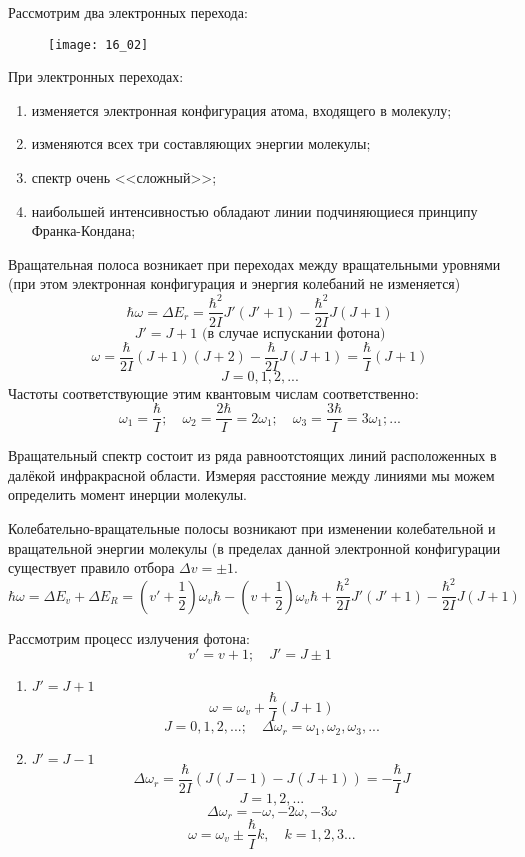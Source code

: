 Рассмотрим два электронных перехода: 
\begin{figure}[h!]
    \center
    \texttt{[image: 16\_02]}
\end{figure}

При электронных переходах:
\begin{enumerate}
    \item изменяется электронная конфигурация атома, 
    входящего в молекулу; 
    \item изменяются всех три составляющих энергии молекулы; 
    \item спектр очень <<сложный>>;
    \item наибольшей интенсивностью обладают линии подчиняющиеся принципу 
    Франка-Кондана;
\end{enumerate}

Вращательная полоса возникает при переходах между вращательными уровнями 
(при этом электронная конфигурация и энергия колебаний не изменяется)
\[ 
    \hbar\omega = \Delta E_r = \frac{\hbar^2}{2I} J'(J'+1) - 
    \frac{\hbar^2}{2I} J(J+1)
\]
\[ J' = J + 1 \text{ (в случае испускании фотона)} \]
\[ 
    \omega = \frac{\hbar}{2I}(J+1)(J+2) - \frac{\hbar}{2I}J(J+1) = 
    \frac{\hbar}{I}(J+1)
\]
\[ 
    J = 0, 1, 2, ...
\]
Частоты соответствующие этим квантовым числам соответственно:
\[ 
    \omega_1 = \frac{\hbar}{I}; \quad
    \omega_2 = \frac{2\hbar}{I} = 2\omega_1; \quad
    \omega_3 = \frac{3\hbar}{I} = 3\omega_1; ...
\]

Вращательный спектр состоит из ряда равноотстоящих линий расположенных в 
далёкой инфракрасной области. Измеряя расстояние между линиями мы можем 
определить момент инерции молекулы.

Колебательно-вращательные полосы возникают при изменении колебательной и 
вращательной энергии молекулы (в пределах данной электронной конфигурации 
существует правило отбора \( \Delta v = \pm 1 \).
\[ 
    \hbar\omega = \Delta E_v + \Delta E_R = 
    \left(v' + \frac{1}{2}\right)\omega_v\hbar - 
    \left(v + \frac{1}{2}\right)\omega_v\hbar + 
    \frac{\hbar^2}{2I}J'(J'+1) - \frac{\hbar^2}{2I}J(J+1)
\]

Рассмотрим процесс излучения фотона:
\[ 
    v' = v + 1; \quad
    J' = J \pm 1
\]
\begin{enumerate}
    \item \( J' = J + 1 \)
        \[ \omega = \omega_v + \frac{\hbar}{I}(J+1) \]
        \[ 
            J = 0, 1, 2, ...; \quad
            \Delta\omega_r = \omega_1, \omega_2, \omega_3, ...
        \]
    \item \( J' = J - 1 \)
        \[ 
            \Delta\omega_r = \frac{\hbar}{2I}
            \left(J(J-1) - J(J+1)\right) = -\frac{\hbar}{I}J
        \]
        \[ J = 1, 2, ... \]
        \[ \Delta\omega_r = -\omega, -2\omega, -3\omega \]
        \[ \omega = \omega_v \pm \frac{\hbar}{I}k,\quad k = 1, 2, 3 ... \]
\end{enumerate}

